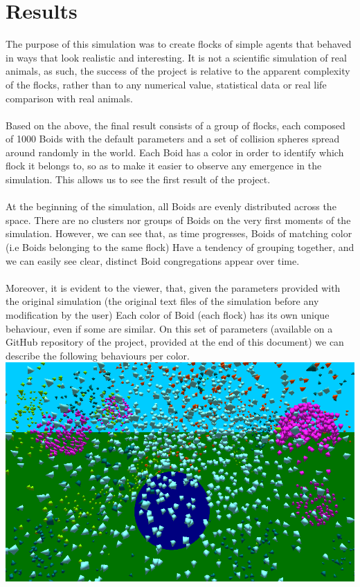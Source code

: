 \documentclass[12pt]{article}
\begin{document}
\section{Results}
The purpose of this simulation was to create flocks of simple agents that behaved in ways that look realistic and interesting. It is not a scientific simulation of real animals, as such, the success of the project is relative to the apparent complexity of the flocks, rather than to any numerical value, statistical data or real life comparison with real animals. 
\\ \\
Based on the above, the final result consists of a group of flocks, each composed of 1000 Boids with the default parameters and a set of collision spheres spread around randomly in the world.
Each Boid has a color in order to identify which flock it belongs to, so as to make it easier to observe any emergence in the simulation. This allows us to see the first result of the project. 
\\ \\
At the beginning of the simulation, all Boids are evenly distributed across the space. There are no clusters nor groups of Boids on the very first moments of the simulation. However, we can see that, as time progresses, Boids of matching color (i.e Boids belonging to the same flock) Have a tendency of grouping together, and we can easily see clear, distinct Boid congregations appear over time. 
\\ \\
Moreover, it is evident to the viewer, that, given the parameters provided with the original simulation (the original text files of the simulation before any modification by the user) Each color of Boid (each flock) has its own unique behaviour, even if some are similar. On this set of parameters (available on a GitHub repository of the project, provided at the end of this document) we can describe the following behaviours per color. \\
\includegraphics[width=\textwidth,height=\textheight,keepaspectratio]{small.png}
\end{document}
